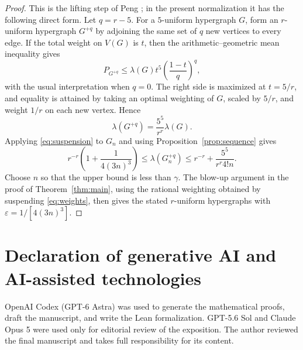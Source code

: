 \documentclass[11pt]{article}
\numberwithin{equation}{section}
\begin{document}
\begin{proof}
This is the lifting step of Peng \cite{Peng09}; in the present
normalization it has the following direct form. Let \(q=r-5\). For a
\(5\)-uniform hypergraph \(G\), form an
\(r\)-uniform hypergraph \(G^{+q}\) by adjoining the same set of
\(q\) new vertices to every edge. If the total weight on \(V(G)\) is
\(t\), then the arithmetic--geometric mean inequality gives
\[
 P_{G^{+q}}\le \lambda(G)t^{5}
 \left(\frac{1-t}{q}\right)^q,
\]
with the usual interpretation when \(q=0\). The right side is
maximized at \(t=5/r\), and equality is attained by taking an optimal
weighting of \(G\), scaled by \(5/r\), and weight \(1/r\) on each new
vertex. Hence
\begin{equation}\label{eq:suspension}
 \lambda(G^{+q})=\frac{5^{5}}{r^r}\lambda(G).
\end{equation}
Applying \eqref{eq:suspension} to \(G_n\) and using
Proposition~\ref{prop:sequence} gives
\[
 r^{-r}\left(1+\frac1{4(3n)^{3}}\right)
 \le \lambda(G_n^{+q})
 \le r^{-r}+\frac{5^{5}}{r^r4!n}.
\]
Choose \(n\) so that the upper bound is less than \(\gamma\).
The blow-up argument in the proof of Theorem~\ref{thm:main}, using the
rational weighting obtained by suspending \eqref{eq:weights}, then
gives the stated \(r\)-uniform hypergraphs with
\(\varepsilon=1/[4(3n)^{3}]\).
\end{proof}

\section*{Declaration of generative AI and AI-assisted technologies}

OpenAI Codex (GPT-6 Astra) was used to generate the mathematical proofs,
draft the manuscript, and write the Lean formalization. GPT-5.6 Sol and
Claude Opus 5 were used only for editorial review of the exposition. The
author reviewed the final manuscript and takes full responsibility for
its content.
\end{document}
